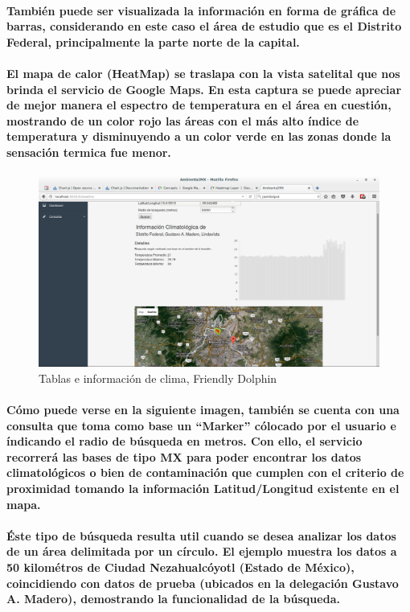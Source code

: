    \paragraph{También puede ser visualizada la información en forma de gráfica de barras, considerando en este caso el área de estudio que es el Distrito Federal, principalmente la parte norte de la capital.}
    \paragraph{El mapa de calor (HeatMap) se traslapa con la vista satelital que nos brinda el servicio de Google Maps. En esta captura se puede apreciar de mejor manera el espectro de temperatura en el área en cuestión, mostrando de un color rojo las áreas con el más alto índice de temperatura y disminuyendo a un color verde en las zonas donde la sensación termica fue menor.}
    \begin{figure}[b!]
      \centering
        \includegraphics[width=\textwidth]{./images/CapturaFriendlyDolphin3}
      \caption{Tablas e información de clima, Friendly Dolphin}
    \end{figure}
    \paragraph{Cómo puede verse en la siguiente imagen, también se cuenta con una consulta que toma como base un ``Marker'' cólocado por el usuario e índicando el radio de búsqueda en metros. Con ello, el servicio recorrerá las bases de tipo MX para poder encontrar los datos climatológicos o bien de contaminación que cumplen con el criterio de proximidad tomando la información Latitud/Longitud existente en el mapa.}
    \paragraph{Éste tipo de búsqueda resulta util cuando se desea analizar los datos de un área delimitada por un círculo. El ejemplo muestra los datos a 50 kilométros de Ciudad Nezahualcóyotl (Estado de México), coincidiendo con datos de prueba (ubicados en la delegación Gustavo A. Madero), demostrando la funcionalidad de la búsqueda.}
